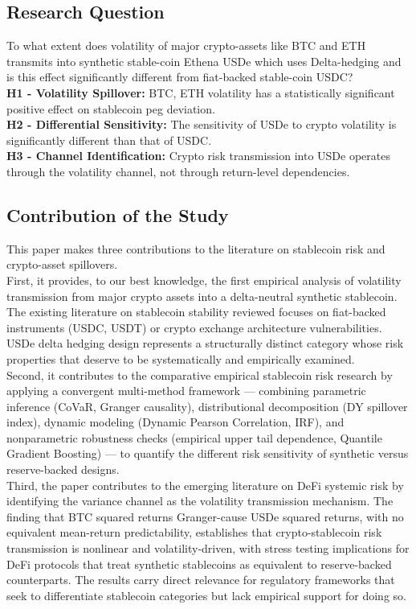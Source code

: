\documentclass[12pt,a4paper,titlepage,oneside,english]{article}
\begin{document}
\subsection{Research Question}
To what extent does volatility of major crypto-assets like BTC and ETH transmits into synthetic stable-coin Ethena USDe which uses Delta-hedging and is this effect significantly different from fiat-backed stable-coin USDC?\\
\textbf{H1 - Volatility Spillover:} BTC, ETH volatility has a statistically significant positive effect on stablecoin peg deviation.\\
\textbf{H2 - Differential Sensitivity:} The sensitivity of USDe to crypto volatility is significantly different than that of USDC.\\
\textbf{H3 - Channel Identification:} Crypto risk transmission into USDe operates through the volatility channel, not through return-level dependencies.\\

\subsection{Contribution of the Study}
 This paper makes three contributions to the literature on stablecoin risk and
crypto-asset spillovers.\\
First, it provides, to our best knowledge, the first empirical analysis of volatility transmission from major crypto assets into a delta-neutral synthetic stablecoin. The existing literature on stablecoin stability reviewed
focuses on fiat-backed instruments (USDC, USDT) or crypto exchange architecture vulnerabilities. 
USDe delta hedging design represents a structurally distinct category whose risk properties that deserve to be
systematically and empirically examined.\\
Second, it contributes to the comparative empirical stablecoin risk research by applying a
convergent multi-method framework — combining parametric inference (CoVaR, Granger
causality), distributional decomposition (DY spillover index), dynamic modeling (Dynamic Pearson Correlation, IRF),
and nonparametric robustness checks (empirical upper tail dependence, Quantile Gradient Boosting)
— to quantify the different risk sensitivity of synthetic versus reserve-backed designs.\\
Third, the paper contributes to the emerging literature on DeFi systemic risk by
identifying the variance channel as the volatility transmission mechanism. The finding
that BTC squared returns Granger-cause USDe squared returns, with no equivalent
mean-return predictability, establishes that crypto-stablecoin risk transmission is
nonlinear and volatility-driven, with stress testing implications for DeFi
protocols that treat synthetic stablecoins as equivalent to reserve-backed counterparts.
The results carry direct relevance for regulatory frameworks that seek to
differentiate stablecoin categories but lack empirical support for doing so.
\end{document}
